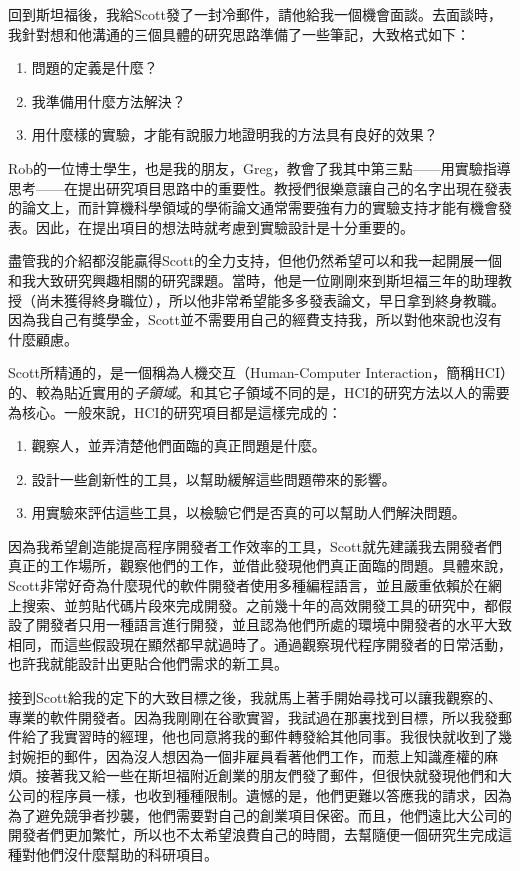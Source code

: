 \documentclass[12pt,UTF8,nofonts]{book}
\begin{document}
回到斯坦福後，我給Scott發了一封冷郵件，請他給我一個機會面談。去面談時，我針對想和他溝通的三個具體的研究思路準備了一些筆記，大致格式如下：

\begin{enumerate}
\item 問題的定義是什麼？
\item 我準備用什麼方法解決？
\item 用什麼樣的實驗，才能有說服力地證明我的方法具有良好的效果？
\end{enumerate}

Rob的一位博士學生，也是我的朋友，Greg，教會了我其中第三點——用實驗指導思考——在提出研究項目思路中的重要性。教授們很樂意讓自己的名字出現在發表的論文上，而計算機科學領域的學術論文通常需要強有力的實驗支持才能有機會發表。因此，在提出項目的想法時就考慮到實驗設計是十分重要的。

盡管我的介紹都沒能贏得Scott的全力支持，但他仍然希望可以和我一起開展一個和我大致研究興趣相關的研究課題。當時，他是一位剛剛來到斯坦福三年的助理教授（尚未獲得終身職位），所以他非常希望能多多發表論文，早日拿到終身教職。因為我自己有獎學金，Scott並不需要用自己的經費支持我，所以對他來說也沒有什麼顧慮。

\breakline

Scott所精通的，是一個稱為人機交互（Human-Computer Interaction，簡稱HCI）的、較為貼近實用的\emph{子領域}。和其它子領域不同的是，HCI的研究方法以人的需要為核心。一般來說，HCI的研究項目都是這樣完成的：

\begin{enumerate}
\item 觀察人，並弄清楚他們面臨的真正問題是什麼。
\item 設計一些創新性的工具，以幫助緩解這些問題帶來的影響。
\item 用實驗來評估這些工具，以檢驗它們是否真的可以幫助人們解決問題。
\end{enumerate}

因為我希望創造能提高程序開發者工作效率的工具，Scott就先建議我去開發者們真正的工作場所，觀察他們的工作，並借此發現他們真正面臨的問題。具體來說，Scott非常好奇為什麼現代的軟件開發者使用多種編程語言，並且嚴重依賴於在網上搜索、並剪貼代碼片段來完成開發。之前幾十年的高效開發工具的研究中，都假設了開發者只用一種語言進行開發，並且認為他們所處的環境中開發者的水平大致相同，而這些假設現在顯然都早就過時了。通過觀察現代程序開發者的日常活動，也許我就能設計出更貼合他們需求的新工具。

接到Scott給我的定下的大致目標之後，我就馬上著手開始尋找可以讓我觀察的、專業的軟件開發者。因為我剛剛在谷歌實習，我試過在那裏找到目標，所以我發郵件給了我實習時的經理，他也同意將我的郵件轉發給其他同事。我很快就收到了幾封婉拒的郵件，因為沒人想因為一個非雇員看著他們工作，而惹上知識產權的麻煩。接著我又給一些在斯坦福附近創業的朋友們發了郵件，但很快就發現他們和大公司的程序員一樣，也收到種種限制。遺憾的是，他們更難以答應我的請求，因為為了避免競爭者抄襲，他們需要對自己的創業項目保密。而且，他們遠比大公司的開發者們更加繁忙，所以也不太希望浪費自己的時間，去幫隨便一個研究生完成這種對他們沒什麼幫助的科研項目。
\end{document}
